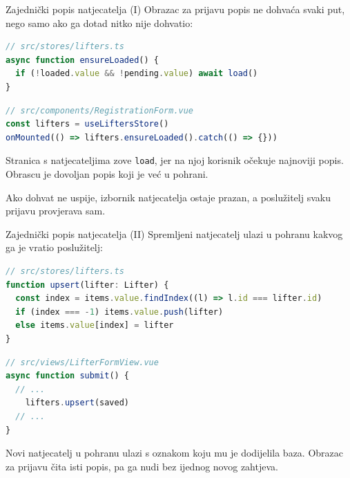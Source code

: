 \begin{frame}[fragile]{Zajednički popis natjecatelja (I)}
Obrazac za prijavu popis ne dohvaća svaki put, nego samo ako ga dotad nitko nije dohvatio:

\begin{lstlisting}[language=typescript]
// src/stores/lifters.ts
async function ensureLoaded() {
  if (!loaded.value && !pending.value) await load()
}
\end{lstlisting}

\vspace{-0.2em}
\begin{lstlisting}[language=typescript]
// src/components/RegistrationForm.vue
const lifters = useLiftersStore()
onMounted(() => lifters.ensureLoaded().catch(() => {}))
\end{lstlisting}

\vspace{0.3em}
Stranica s natjecateljima zove \texttt{load}, jer na njoj korisnik očekuje najnoviji popis. Obrascu je dovoljan popis koji je već u pohrani.

\vspace{0.3em}
Ako dohvat ne uspije, izbornik natjecatelja ostaje prazan, a poslužitelj svaku prijavu provjerava sam.
\end{frame}

\begin{frame}[fragile]{Zajednički popis natjecatelja (II)}
Spremljeni natjecatelj ulazi u pohranu kakvog ga je vratio poslužitelj:

\begin{lstlisting}[language=typescript]
// src/stores/lifters.ts
function upsert(lifter: Lifter) {
  const index = items.value.findIndex((l) => l.id === lifter.id)
  if (index === -1) items.value.push(lifter)
  else items.value[index] = lifter
}
\end{lstlisting}

\vspace{-0.2em}
\begin{lstlisting}[language=typescript]
// src/views/LifterFormView.vue
async function submit() {
  // ...
    lifters.upsert(saved)
  // ...
}
\end{lstlisting}

\vspace{0.3em}
Novi natjecatelj u pohranu ulazi s oznakom koju mu je dodijelila baza. Obrazac za prijavu čita isti popis, pa ga nudi bez ijednog novog zahtjeva.
\end{frame}

